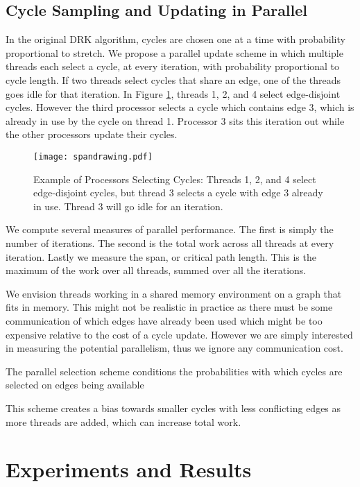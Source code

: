 \documentclass{sig-alternate}
\begin{document}
\subsection{Cycle Sampling and Updating in Parallel}
In the original DRK algorithm, cycles are chosen one at a time with
probability proportional to stretch.
We propose a parallel update scheme
in which multiple threads each select a cycle,
at every iteration, with
probability proportional to cycle length. If two threads
select cycles that share an edge, one of the threads goes idle for that
iteration. In Figure \ref{parallelcycle}, threads 1, 2, and 4 select
edge-disjoint cycles.
However the third processor selects a cycle which contains edge 3,
which is already in use by the cycle on thread 1. Processor 3 sits this
iteration out while the other processors update their cycles.



\begin{figure}[h]
\centering
\texttt{[image: spandrawing.pdf]}
\caption{Example of Processors Selecting Cycles: Threads 1, 2, and 4 select
edge-disjoint cycles, but thread 3 selects a cycle with edge 3 already in use.
Thread 3 will go idle for an iteration.}
\label{parallelcycle}
\end{figure}

We compute several measures of parallel performance.
The first is simply the number of iterations. The second is the total work
across all threads at every iteration. Lastly we measure the span,
or critical path length. This is the maximum of the work over all threads,
summed over all the iterations.

We envision threads working in a shared memory environment on a graph
that fits in memory.
This might not be realistic in practice as there must be some communication of
which edges have already been used which might be too expensive relative to the
cost of a cycle
update. However we are simply interested in measuring
the potential parallelism, thus we ignore any communication cost.

The parallel selection scheme conditions
the probabilities with which cycles are selected on
edges being available

This scheme creates a bias
towards smaller cycles with less conflicting
edges as more threads are added, which can increase total work.


\newpage
\section{Experiments and Results}
\end{document}
